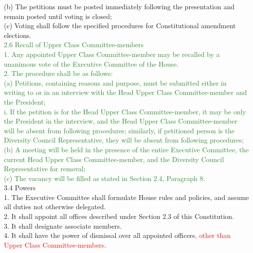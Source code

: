 \documentclass[10pt]{article} %
\begin{document}
\begin{itemize}
	(b) The petitions must be posted immediately following the presentation and remain posted until voting is closed; \\
	(c) Voting shall follow the specified procedures for Constitutional amendment elections. \\
	\textcolor{ForestGreen}{2.6 Recall of Upper Class Committee-members} \\
	\textcolor{ForestGreen}{1. Any appointed Upper Class Committee-member may be recalled by a unanimous vote of the Executive Committee of the House.} \\
	\textcolor{ForestGreen}{2. The procedure shall be as follows:} \\
	\textcolor{ForestGreen}{(a) Petitions, containing reasons and purpose, must be submitted either in writing to or in an interview with the Head Upper Class Committee-member and the President;} \\
	\textcolor{ForestGreen}{i. If the petition is for the Head Upper Class Committee-member, it may be only the President in the interview, and the Head Upper Class Committee-member will be absent from following procedures; similarly, if petitioned person is the Diversity Council Representative, they will be absent from following procedures;} \\
	\textcolor{ForestGreen}{(b) A meeting will be held in the presence of the entire Executive Committee, the current Head Upper Class Committee-member, and the Diversity Council Representative for removal;} \\
	\textcolor{ForestGreen}{(c) The vacancy will be filled as stated in Section 2.4, Paragraph 8.} \\
	3.4 Powers \\
	1. The Executive Committee shall formulate House rules and policies, and assume all duties not otherwise delegated. \\
	2. It shall appoint all offices described under Section 2.3 of this Constitution. \\
	3. It shall designate associate members. \\
	4. It shall have the power of dismissal over all appointed officers\textcolor{red}{, other than Upper Class Committee-members}.
\end{itemize}
\end{document}
